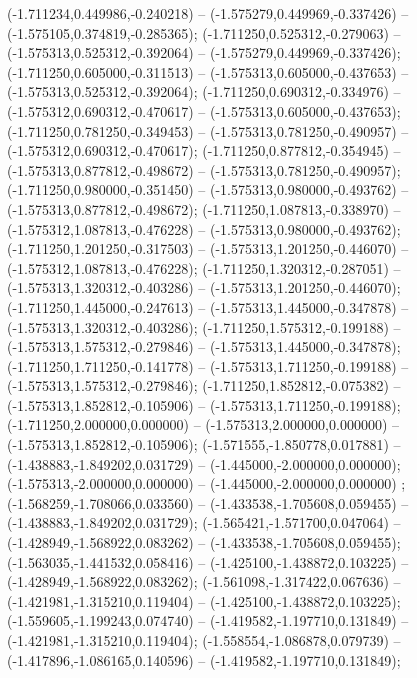  (-1.711234,0.449986,-0.240218) -- (-1.575279,0.449969,-0.337426) -- (-1.575105,0.374819,-0.285365);
 (-1.711250,0.525312,-0.279063) -- (-1.575313,0.525312,-0.392064) -- (-1.575279,0.449969,-0.337426);
 (-1.711250,0.605000,-0.311513) -- (-1.575313,0.605000,-0.437653) -- (-1.575313,0.525312,-0.392064);
 (-1.711250,0.690312,-0.334976) -- (-1.575312,0.690312,-0.470617) -- (-1.575313,0.605000,-0.437653);
 (-1.711250,0.781250,-0.349453) -- (-1.575313,0.781250,-0.490957) -- (-1.575312,0.690312,-0.470617);
 (-1.711250,0.877812,-0.354945) -- (-1.575313,0.877812,-0.498672) -- (-1.575313,0.781250,-0.490957);
 (-1.711250,0.980000,-0.351450) -- (-1.575313,0.980000,-0.493762) -- (-1.575313,0.877812,-0.498672);
 (-1.711250,1.087813,-0.338970) -- (-1.575312,1.087813,-0.476228) -- (-1.575313,0.980000,-0.493762);
 (-1.711250,1.201250,-0.317503) -- (-1.575313,1.201250,-0.446070) -- (-1.575312,1.087813,-0.476228);
 (-1.711250,1.320312,-0.287051) -- (-1.575313,1.320312,-0.403286) -- (-1.575313,1.201250,-0.446070);
 (-1.711250,1.445000,-0.247613) -- (-1.575313,1.445000,-0.347878) -- (-1.575313,1.320312,-0.403286);
 (-1.711250,1.575312,-0.199188) -- (-1.575313,1.575312,-0.279846) -- (-1.575313,1.445000,-0.347878);
 (-1.711250,1.711250,-0.141778) -- (-1.575313,1.711250,-0.199188) -- (-1.575313,1.575312,-0.279846);
 (-1.711250,1.852812,-0.075382) -- (-1.575313,1.852812,-0.105906) -- (-1.575313,1.711250,-0.199188);
 (-1.711250,2.000000,0.000000) -- (-1.575313,2.000000,0.000000) -- (-1.575313,1.852812,-0.105906);
 (-1.571555,-1.850778,0.017881) -- (-1.438883,-1.849202,0.031729) -- (-1.445000,-2.000000,0.000000);
 (-1.575313,-2.000000,0.000000) -- (-1.445000,-2.000000,0.000000) ;
 (-1.568259,-1.708066,0.033560) -- (-1.433538,-1.705608,0.059455) -- (-1.438883,-1.849202,0.031729);
 (-1.565421,-1.571700,0.047064) -- (-1.428949,-1.568922,0.083262) -- (-1.433538,-1.705608,0.059455);
 (-1.563035,-1.441532,0.058416) -- (-1.425100,-1.438872,0.103225) -- (-1.428949,-1.568922,0.083262);
 (-1.561098,-1.317422,0.067636) -- (-1.421981,-1.315210,0.119404) -- (-1.425100,-1.438872,0.103225);
 (-1.559605,-1.199243,0.074740) -- (-1.419582,-1.197710,0.131849) -- (-1.421981,-1.315210,0.119404);
 (-1.558554,-1.086878,0.079739) -- (-1.417896,-1.086165,0.140596) -- (-1.419582,-1.197710,0.131849);
